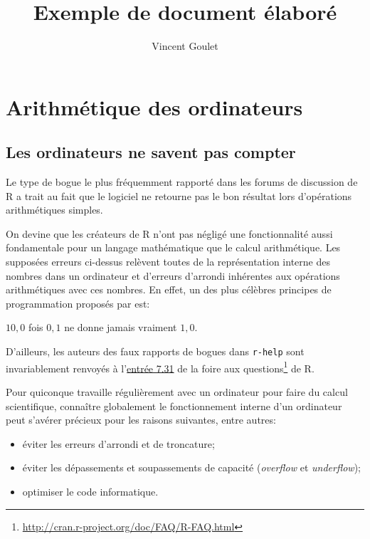 \documentclass[letterpaper,11pt]{memoir}
\title{Exemple de document élaboré}
\author{Vincent Goulet}
\theoremstyle{plain}
\theoremstyle{definition}
\theoremstyle{remark}
\begin{document}
\frontmatter                    %

\maketitle                      %

\tableofcontents                %
\cleardoublepage

\mainmatter                     %

\chapter{Arithmétique des ordinateurs}
\label{chap:ordinateurs}

\section{Les ordinateurs ne savent pas compter}
\label{sec:ordinateurs:introduction}

Le type de bogue le plus fréquemment rapporté dans les forums de
discussion de R a trait au fait que le logiciel ne retourne
pas le bon résultat lors d'opérations arithmétiques simples.

On devine que les créateurs de R n'ont pas négligé une fonctionnalité
aussi fondamentale pour un langage mathématique que le calcul
arithmétique. Les supposées erreurs ci-dessus relèvent toutes de la
représentation interne des nombres dans un ordinateur et d'erreurs
d'arrondi inhérentes aux opérations arithmétiques avec ces nombres. En
effet, un des plus célèbres principes de programmation proposés par
\cite{Kernighan:style:1978} est:
\begin{center}
  \label{programming_principle}
  $10,0$ fois $0,1$ ne donne jamais vraiment $1,0$.
\end{center}
D'ailleurs, les auteurs des faux rapports de bogues dans
\texttt{r-help} sont invariablement renvoyés à l'\href{http://cran.r-project.org/doc/FAQ/R-FAQ.html#Why-doesn_0027t-R-think-these-numbers-are-equal_003f}{entrée 7.31} de la
foire aux questions\footnote{%
  \url{http://cran.r-project.org/doc/FAQ/R-FAQ.html}} %
de R.

Pour quiconque travaille régulièrement avec un ordinateur pour faire
du calcul scientifique, connaître globalement le fonctionnement
interne d'un ordinateur peut s'avérer précieux pour les raisons
suivantes, entre autres:
\begin{itemize}
\item éviter les erreurs d'arrondi et de troncature;
\item éviter les dépassements et soupassements de capacité
  (\emph{overflow} et \emph{underflow});
\item optimiser le code informatique.
\end{itemize}
\end{document}
